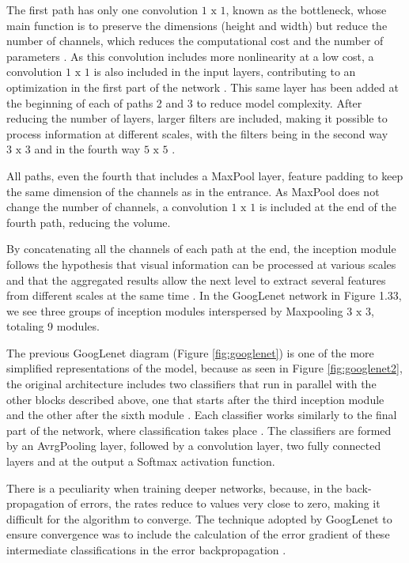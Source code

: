 The first path has only one convolution $1\text{ x }1$, known as the bottleneck, whose main function is to preserve the dimensions (height and width) but reduce the number of channels, which reduces the computational cost and the number of parameters \cite{elgendy2020}. As this convolution includes more nonlinearity at a low cost, a convolution $1\text{ x }1$ is also included in the input layers, contributing to an optimization in the first part of the network \cite{geron2019}. This same layer has been added at the beginning of each of paths 2 and 3 to reduce model complexity. After reducing the number of layers, larger filters are included, making it possible to process information at different scales, with the filters being in the second way $3\text{ x }3$ and in the fourth way  $5\text{ x }5$ \cite{zhang2020dive}.

All paths, even the fourth that includes a MaxPool layer, feature padding to keep the same dimension of the channels as in the entrance. As MaxPool does not change the number of channels, a convolution $1\text{ x }1$ is included at the end of the fourth path, reducing the volume.

By concatenating all the channels of each path at the end, the inception module follows the hypothesis that visual information can be processed at various scales and that the aggregated results allow the next level to extract several features from different scales at the same time \cite{elgendy2020}. In the GoogLenet network in Figure 1.33, we see three groups of inception modules interspersed by Maxpooling $3\text{ x }3$, totaling 9 modules.

The previous GoogLenet diagram (Figure \ref{fig:googlenet}) is one of the more simplified representations of the model, because as seen in Figure \ref{fig:googlenet2}, the original architecture includes two classifiers that run in parallel with the other blocks described above, one that starts after the third inception module and the other after the sixth module \cite{geron2019}. Each classifier works similarly to the final part of the network, where classification takes place \cite{johnson2019}. The classifiers are formed by an AvrgPooling layer, followed by a convolution layer, two fully connected layers and at the output a Softmax activation function.

There is a peculiarity when training deeper networks, because, in the back-propagation of errors, the rates reduce to values very close to zero, making it difficult for the algorithm to converge. The technique adopted by GoogLenet to ensure convergence was to include the calculation of the error gradient of these intermediate classifications in the error backpropagation \cite{geron2019}.

